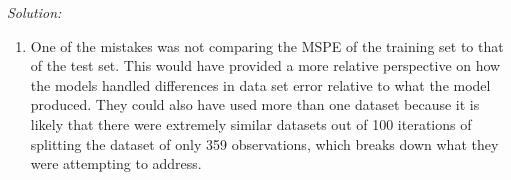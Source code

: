\documentclass{article}
\newenvironment{solution}
    {\textit{Solution:}}
    {}
\begin{document}
\begin{solution}
\begin{enumerate}
	\item One of the mistakes was not comparing the MSPE of the training set to that of the test set. This would have provided a more relative perspective on how the models handled differences in data set error relative to what the model produced. They could also have used more than one dataset because it is likely that there were extremely similar datasets out of 100 iterations of splitting the dataset of only 359 observations, which breaks down what they were attempting to address.
\end{enumerate}
\end{solution}
\end{document}
